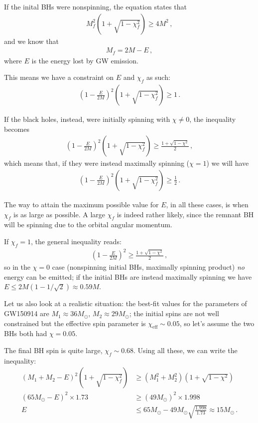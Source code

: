 \documentclass[main.tex]{subfiles}
\begin{document}
If the inital BHs were nonspinning, the equation states that %
\begin{align}
M_f^2 \left(1 + \sqrt{1 - \chi _f^2}\right) \geq 4 M^2
\,,
\end{align}
%
and we know that %
\begin{align}
M_f = 2M - E
\,,
\end{align}
%
where \(E\) is the energy lost by GW emission. 

This means we have a constraint on \(E\) and \(\chi _f\) as such: %
\begin{align}
\left(1 - \frac{E}{2M}\right)^2 \left(1 + \sqrt{1 - \chi _f^2}\right) \geq 1
\,.
\end{align}

If the black holes, instead, were initially spinning with \(\chi \neq 0\), the inequality becomes %
\begin{align}
\left(1 - \frac{E}{2M}\right)^2 \left(1 + \sqrt{1 - \chi _f^2}\right) \geq \frac{1 + \sqrt{1 - \chi^2}}{2}
\,,
\end{align}
%
which means that, if they were instead maximally spinning (\(\chi = 1\)) we will have 
%
\begin{align}
\left(1 - \frac{E}{2M}\right)^2 \left(1 + \sqrt{1 - \chi _f^2}\right) \geq \frac{1}{2}
\,.
\end{align}

The way to attain the maximum possible value for \(E\), in all these cases, is when \(\chi _f\) is as large as possible. 
A large \(\chi _f\) is indeed rather likely, since the remnant BH will be spinning due to the orbital angular momentum. 

If \(\chi _f = 1\), the general inequality reads: 
%
\begin{align}
\left(1 - \frac{E}{2M}\right)^2 \geq \frac{1 + \sqrt{1 - \chi^2}}{2} 
\,,
\end{align}
%
so in the \(\chi = 0\) case (nonspinning initial BHs, maximally spinning product) \emph{no} energy can be emitted; if the initial BHs are instead maximally spinning we have \(E \leq 2M ( 1 - 1/\sqrt{2}) \approx 0.59 M\).

Let us also look at a realistic situation: the best-fit values for the parameters of GW150914 are \(M_1 \approx 36M_{\odot}\), \(M_2 \approx 29M_{\odot}\); the initial spins are not well constrained but the effective spin parameter is \(\chi _{\text{eff}} \sim 0.05\), so let's assume the two BHs both had \(\chi = 0.05\). 

The final BH spin is quite large, \(\chi _f \sim 0.68\). 
Using all these, we can write the inequality: %
\begin{align}
(M_1 + M_2 - E)^2 \left(1 + \sqrt{1 - \chi_f^2}\right) &\geq (M_1^2 + M_2^2 ) \left(1 + \sqrt{1 - \chi^2}\right)  \\
(65 M_{\odot} - E)^2 \times 1.73 &\geq (49 M_{\odot})^2 \times 1.998  \\
E &\leq 65M_{\odot} - 49 M_{\odot} \sqrt{\frac{1.998}{1.73}} \approx 15 M_{\odot}
\,.
\end{align}
\end{document}
